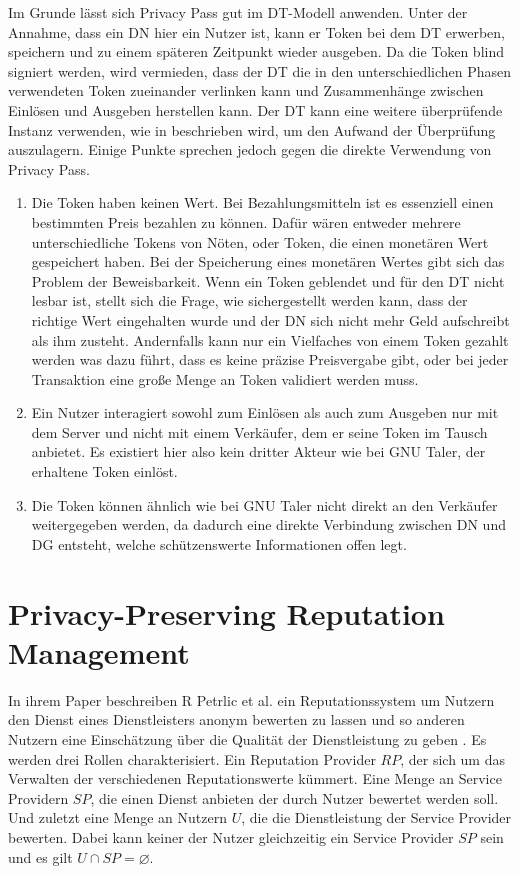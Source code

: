 \documentclass[
	fontsize=11pt,
	headings=small,
	parskip=half,           %
	bibliography=totoc,
	numbers=noenddot,       %
	open=any,               %
]{scrreprt}
\begin{document}
Im Grunde lässt sich Privacy Pass gut im DT-Modell anwenden. Unter der Annahme, dass ein DN hier ein Nutzer ist, kann er Token bei dem DT erwerben, speichern und zu einem späteren Zeitpunkt wieder ausgeben. Da die Token blind signiert werden, wird vermieden, dass der DT die in den unterschiedlichen Phasen verwendeten Token zueinander verlinken kann und Zusammenhänge zwischen Einlösen und Ausgeben herstellen kann. Der DT kann eine weitere überprüfende Instanz verwenden, wie in \cite{pp-davidson2018privacy} beschrieben wird, um den Aufwand der Überprüfung auszulagern. Einige Punkte sprechen jedoch gegen die direkte Verwendung von Privacy Pass. 
\begin{enumerate}
    \item Die Token haben keinen Wert. Bei Bezahlungsmitteln ist es essenziell einen bestimmten Preis bezahlen zu können. Dafür wären entweder mehrere unterschiedliche Tokens von Nöten, oder Token, die einen monetären Wert gespeichert haben. Bei der Speicherung eines monetären Wertes gibt sich das Problem der Beweisbarkeit. Wenn ein Token geblendet und für den DT nicht lesbar ist, stellt sich die Frage, wie sichergestellt werden  kann, dass der richtige Wert eingehalten wurde und der DN sich nicht mehr Geld aufschreibt als ihm zusteht. Andernfalls kann nur ein Vielfaches von einem Token gezahlt werden was dazu führt, dass es keine präzise Preisvergabe gibt, oder bei jeder Transaktion eine große Menge an Token validiert werden muss.
    \item Ein Nutzer interagiert sowohl zum Einlösen als auch zum Ausgeben nur mit dem Server und nicht mit einem Verkäufer, dem er seine Token im Tausch anbietet. Es existiert hier also kein dritter Akteur wie bei GNU Taler, der erhaltene Token einlöst.
    \item Die Token können ähnlich wie bei GNU Taler nicht direkt an den Verkäufer weitergegeben werden, da dadurch eine direkte Verbindung zwischen DN und DG entsteht, welche schützenswerte Informationen offen legt.
\end{enumerate}

\section{Privacy-Preserving Reputation Management}
\label{subsec:rep}
In ihrem Paper beschreiben R Petrlic et al. ein Reputationssystem um Nutzern den Dienst eines Dienstleisters anonym bewerten zu lassen und so anderen Nutzern eine Einschätzung über die Qualität der Dienstleistung zu geben \cite{petrlic2014privacy}. Es werden drei Rollen charakterisiert. Ein Reputation Provider $RP$, der sich um das Verwalten der verschiedenen Reputationswerte kümmert. Eine Menge an Service Providern $SP$, die einen Dienst anbieten der durch Nutzer bewertet werden soll. Und zuletzt eine Menge an Nutzern $U$, die die Dienstleistung der Service Provider bewerten. Dabei kann keiner der Nutzer gleichzeitig ein Service Provider $SP$ sein und es gilt $U \cap SP = \varnothing$. 
\end{document}
